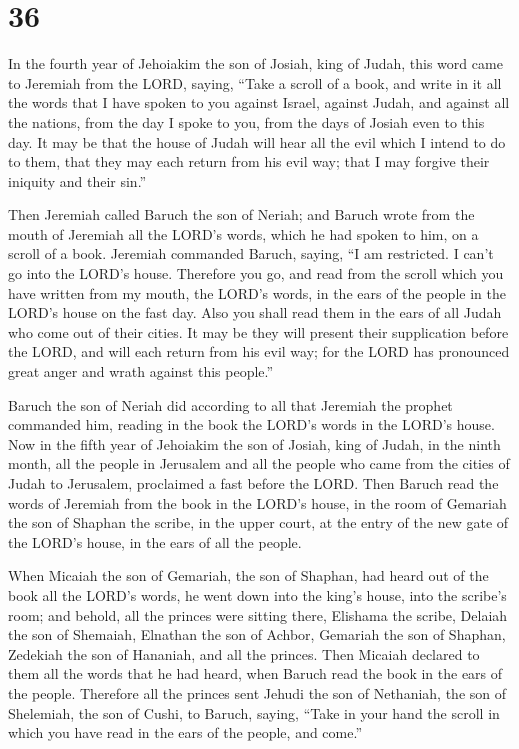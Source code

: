 \hypertarget{section-35}{%
\section{36}\label{section-35}}

 In the fourth year of Jehoiakim the son of Josiah, king
of Judah, this word came to Jeremiah from the LORD, saying,
 ``Take a scroll of a book, and write in it all the words
that I have spoken to you against Israel, against Judah, and against all
the nations, from the day I spoke to you, from the days of Josiah even
to this day.  It may be that the house of Judah will hear
all the evil which I intend to do to them, that they may each return
from his evil way; that I may forgive their iniquity and their sin.''

 Then Jeremiah called Baruch the son of Neriah; and Baruch
wrote from the mouth of Jeremiah all the LORD's words, which he had
spoken to him, on a scroll of a book.  Jeremiah commanded
Baruch, saying, ``I am restricted. I can't go into the LORD's house.
 Therefore you go, and read from the scroll which you have
written from my mouth, the LORD's words, in the ears of the people in
the LORD's house on the fast day. Also you shall read them in the ears
of all Judah who come out of their cities.  It may be they
will present their supplication before the LORD, and will each return
from his evil way; for the LORD has pronounced great anger and wrath
against this people.''

 Baruch the son of Neriah did according to all that
Jeremiah the prophet commanded him, reading in the book the LORD's words
in the LORD's house.  Now in the fifth year of Jehoiakim
the son of Josiah, king of Judah, in the ninth month, all the people in
Jerusalem and all the people who came from the cities of Judah to
Jerusalem, proclaimed a fast before the LORD.  Then
Baruch read the words of Jeremiah from the book in the LORD's house, in
the room of Gemariah the son of Shaphan the scribe, in the upper court,
at the entry of the new gate of the LORD's house, in the ears of all the
people.

 When Micaiah the son of Gemariah, the son of Shaphan,
had heard out of the book all the LORD's words,  he went
down into the king's house, into the scribe's room; and behold, all the
princes were sitting there, Elishama the scribe, Delaiah the son of
Shemaiah, Elnathan the son of Achbor, Gemariah the son of Shaphan,
Zedekiah the son of Hananiah, and all the princes.  Then
Micaiah declared to them all the words that he had heard, when Baruch
read the book in the ears of the people.  Therefore all
the princes sent Jehudi the son of Nethaniah, the son of Shelemiah, the
son of Cushi, to Baruch, saying, ``Take in your hand the scroll in which
you have read in the ears of the people, and come.''

